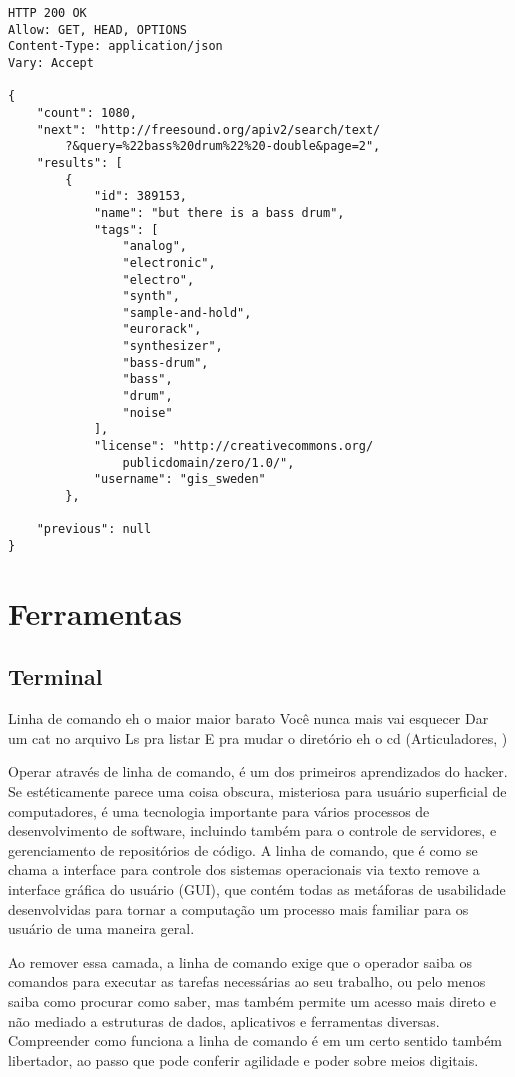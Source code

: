 \begin{verbatim}
HTTP 200 OK
Allow: GET, HEAD, OPTIONS
Content-Type: application/json
Vary: Accept

{
    "count": 1080,
    "next": "http://freesound.org/apiv2/search/text/
        ?&query=%22bass%20drum%22%20-double&page=2",
    "results": [
        {
            "id": 389153,
            "name": "but there is a bass drum",
            "tags": [
                "analog",
                "electronic",
                "electro",
                "synth",
                "sample-and-hold",
                "eurorack",
                "synthesizer",
                "bass-drum",
                "bass",
                "drum",
                "noise"
            ],
            "license": "http://creativecommons.org/
                publicdomain/zero/1.0/",
            "username": "gis_sweden"
        },
        
    "previous": null
}

\end{verbatim}



\section{Ferramentas}
\subsection{Terminal}

\begin{citacao}
Linha de comando eh o maior maior barato
Você nunca mais vai esquecer
Dar um cat no arquivo
Ls pra listar
E pra mudar o diretório eh o cd (Articuladores, )
\end{citacao}

Operar através de linha de comando, é um dos primeiros aprendizados do hacker. Se estéticamente parece uma coisa obscura, misteriosa para usuário superficial de computadores, é uma tecnologia importante para vários processos de desenvolvimento de software, incluindo também para o controle de servidores, e gerenciamento de repositórios de código. A linha de comando, que é como se chama a interface para controle dos sistemas operacionais via texto remove a interface gráfica do usuário (GUI), que contém todas as metáforas de usabilidade desenvolvidas para tornar a computação um processo mais familiar para os usuário de uma maneira geral.

Ao remover essa camada, a linha de comando exige que o operador saiba os comandos para executar as tarefas necessárias ao seu trabalho, ou pelo menos saiba como procurar como saber, mas também permite um acesso mais direto e não mediado a estruturas de dados, aplicativos e ferramentas diversas. Compreender como funciona a linha de comando é em um certo sentido também libertador, ao passo que pode conferir agilidade e poder sobre meios digitais. 

